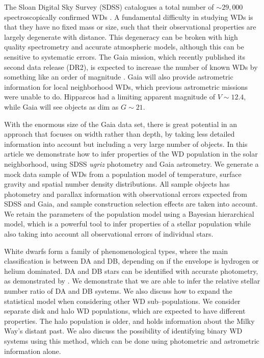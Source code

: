 \documentclass[fleqn,usenatbib]{mnras}
\begin{document}
The Sloan Digital Sky Survey (SDSS) catalogues a total number of $\sim 29,000$ spectroscopically confirmed WDs \citep{2013ApJS..204....5K,2015MNRAS.446.4078K}. A fundamental difficulty in studying WDs is that they have no fixed mass or size, such that their observational properties are largely degenerate with distance. This degeneracy can be broken with high quality spectrometry and accurate atmospheric models, although this can be sensitive to systematic errors. The Gaia mission, which recently published its second data release (DR2), is expected to increase the number of known WDs by something like an order of magnitude \citep{2014A&A...565A..11C,Jordan:2006jg}. Gaia will also provide astrometric information for local neighborhood WDs, which previous astrometric missions were unable to do. Hipparcos had a limiting apparent magnitude of $V \sim 12.4$, while Gaia will see objects as dim as $G \sim 21$.

With the enormous size of the Gaia data set, there is great potential in an approach that focuses on width rather than depth, by taking less detailed information into account but including a very large number of objects. In this article we demonstrate how to infer properties of the WD population in the solar neighborhood, using SDSS \emph{ugriz} photometry and Gaia astrometry. We generate a mock data sample of WDs from a population model of temperature, surface gravity and spatial number density distributions. All sample objects has photometry and parallax information with observational errors expected from SDSS and Gaia, and sample construction selection effects are taken into account. We retain the parameters of the population model using a Bayesian hierarchical model, which is a powerful tool to infer properties of a stellar population while also taking into account all observational errors of individual stars.

White dwarfs form a family of phenomenological types, where the main classification is between DA and DB, depending on if the envelope is hydrogen or helium dominated. DA and DB stars can be identified with accurate photometry, as demonstrated by \cite{Mortlock:2008gf}. We demonstrate that we are able to infer the relative stellar number ratio of DA and DB systems. We also discuss how to expand the statistical model when considering other WD sub--populations. We consider separate disk and halo WD populations, which are expected to have different properties. The halo population is older, and holds information about the Milky Way's distant past. We also discuss the possibility of identifying binary WD systems using this method, which can be done using photometric and astrometric information alone.
\end{document}
